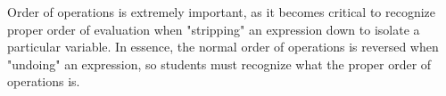 





Order of operations is extremely important, as it becomes critical to recognize proper order of evaluation when "stripping" an expression down to isolate a particular variable.  In essence, the normal order of operations is reversed when "undoing" an expression, so students must recognize what the proper order of operations is.




